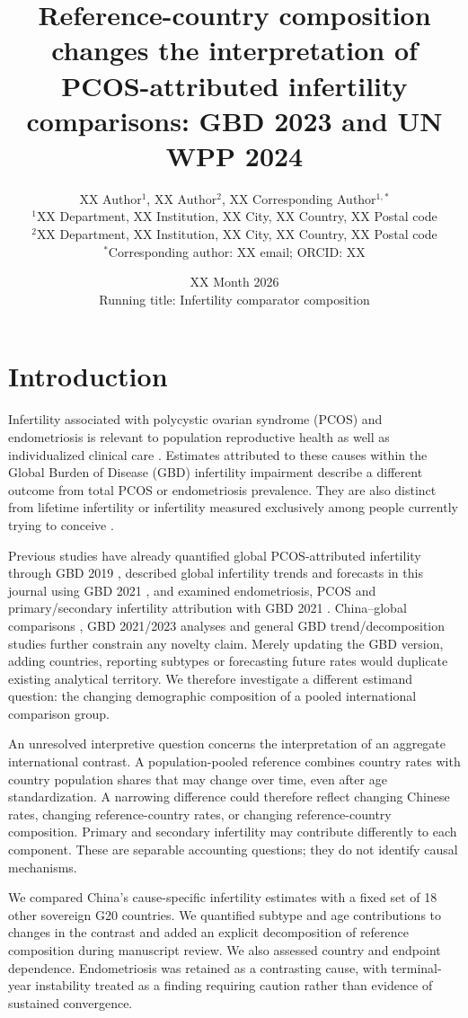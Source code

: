 \documentclass[11pt,a4paper]{article}
\title{Reference-country composition changes the interpretation of PCOS-attributed infertility comparisons: GBD 2023 and UN WPP 2024}
\author{XX Author$^{1}$, XX Author$^{2}$, XX Corresponding Author$^{1,*}$\\
{\small $^{1}$XX Department, XX Institution, XX City, XX Country, XX Postal code}\\
{\small $^{2}$XX Department, XX Institution, XX City, XX Country, XX Postal code}\\
{\small $^{*}$Corresponding author: XX email; ORCID: XX}}
\date{XX Month 2026\\{\small Running title: Infertility comparator composition}}
\begin{document}
\maketitle
\linenumbers

\section{Introduction}
Infertility associated with polycystic ovarian syndrome (PCOS) and endometriosis is relevant to population reproductive health as well as individualized clinical care \cite{pcos,eshre}. Estimates attributed to these causes within the Global Burden of Disease (GBD) infertility impairment describe a different outcome from total PCOS or endometriosis prevalence. They are also distinct from lifetime infertility or infertility measured exclusively among people currently trying to conceive \cite{gbd}.

Previous studies have already quantified global PCOS-attributed infertility through GBD 2019 \cite{liu_pcos2024}, described global infertility trends and forecasts in this journal using GBD 2021 \cite{liang2025}, and examined endometriosis, PCOS and primary/secondary infertility attribution with GBD 2021 \cite{xu}. China--global comparisons \cite{lu}, GBD 2021/2023 analyses \cite{wang} and general GBD trend/decomposition studies \cite{feng} further constrain any novelty claim. Merely updating the GBD version, adding countries, reporting subtypes or forecasting future rates would duplicate existing analytical territory. We therefore investigate a different estimand question: the changing demographic composition of a pooled international comparison group.

An unresolved interpretive question concerns the interpretation of an aggregate international contrast. A population-pooled reference combines country rates with country population shares that may change over time, even after age standardization. A narrowing difference could therefore reflect changing Chinese rates, changing reference-country rates, or changing reference-country composition. Primary and secondary infertility may contribute differently to each component. These are separable accounting questions; they do not identify causal mechanisms.

We compared China's cause-specific infertility estimates with a fixed set of 18 other sovereign G20 countries. We quantified subtype and age contributions to changes in the contrast and added an explicit decomposition of reference composition during manuscript review. We also assessed country and endpoint dependence. Endometriosis was retained as a contrasting cause, with terminal-year instability treated as a finding requiring caution rather than evidence of sustained convergence.
\end{document}
